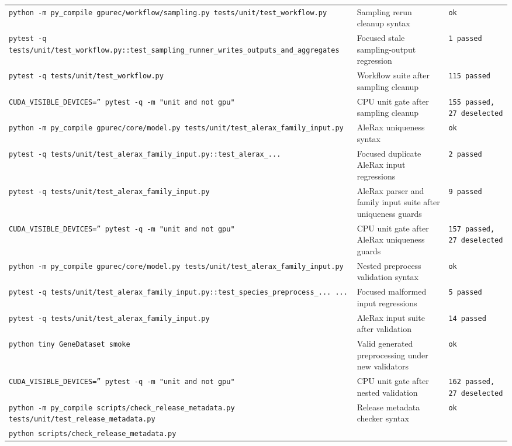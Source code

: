 \documentclass[11pt]{article}
\begin{document}
\begin{center}
\begin{tabular}{lll}
\texttt{python -m py\_compile gpurec/workflow/sampling.py tests/unit/test\_workflow.py} &
Sampling rerun cleanup syntax &
\texttt{ok} \\
\texttt{pytest -q tests/unit/test\_workflow.py::test\_sampling\_runner\_writes\_outputs\_and\_aggregates} &
Focused stale sampling-output regression &
\texttt{1 passed} \\
\texttt{pytest -q tests/unit/test\_workflow.py} &
Workflow suite after sampling cleanup &
\texttt{115 passed} \\
\texttt{CUDA\_VISIBLE\_DEVICES='' pytest -q -m "unit and not gpu"} &
CPU unit gate after sampling cleanup &
\texttt{155 passed, 27 deselected} \\
\texttt{python -m py\_compile gpurec/core/model.py tests/unit/test\_alerax\_family\_input.py} &
AleRax uniqueness syntax &
\texttt{ok} \\
\texttt{pytest -q tests/unit/test\_alerax\_family\_input.py::test\_alerax\_...} &
Focused duplicate AleRax input regressions &
\texttt{2 passed} \\
\texttt{pytest -q tests/unit/test\_alerax\_family\_input.py} &
AleRax parser and family input suite after uniqueness guards &
\texttt{9 passed} \\
\texttt{CUDA\_VISIBLE\_DEVICES='' pytest -q -m "unit and not gpu"} &
CPU unit gate after AleRax uniqueness guards &
\texttt{157 passed, 27 deselected} \\
\texttt{python -m py\_compile gpurec/core/model.py tests/unit/test\_alerax\_family\_input.py} &
Nested preprocess validation syntax &
\texttt{ok} \\
\texttt{pytest -q tests/unit/test\_alerax\_family\_input.py::test\_species\_preprocess\_... ...} &
Focused malformed input regressions &
\texttt{5 passed} \\
\texttt{pytest -q tests/unit/test\_alerax\_family\_input.py} &
AleRax input suite after validation &
\texttt{14 passed} \\
\texttt{python tiny GeneDataset smoke} &
Valid generated preprocessing under new validators &
\texttt{ok} \\
\texttt{CUDA\_VISIBLE\_DEVICES='' pytest -q -m "unit and not gpu"} &
CPU unit gate after nested validation &
\texttt{162 passed, 27 deselected} \\
\texttt{python -m py\_compile scripts/check\_release\_metadata.py tests/unit/test\_release\_metadata.py} &
Release metadata checker syntax &
\texttt{ok} \\
\texttt{python scripts/check\_release\_metadata.py} &

\end{tabular}
\end{center}
\end{document}

